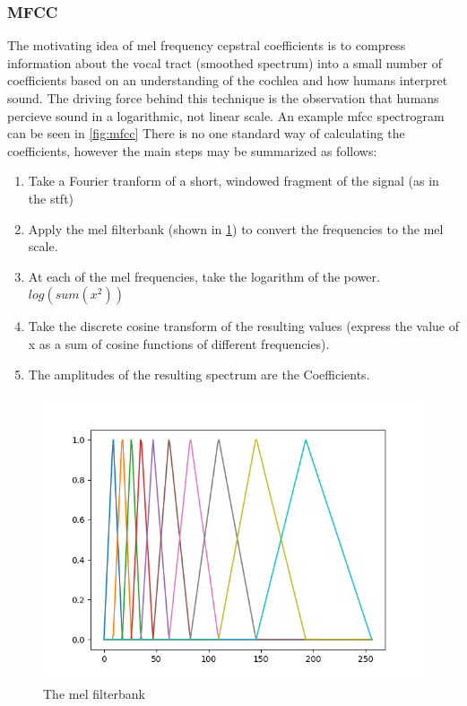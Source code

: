 \documentclass[11pt]{article}
\begin{document}
\subsubsection{MFCC}
\label{sec:org657745a}

The motivating idea of mel frequency cepstral coefficients is to compress information about the vocal tract (smoothed spectrum) into a small number of coefficients based on an understanding of the cochlea and how humans interpret sound. The driving force behind this technique is the observation that humans percieve sound in a logarithmic, not linear scale. An example mfcc spectrogram can be seen in \ref{fig:mfcc} There is no one standard way of calculating the coefficients, however the main steps may be summarized as follows:

\begin{enumerate}
    \item Take a Fourier tranform of a short, windowed fragment of the signal (as in the stft)
    \item Apply the mel filterbank (shown in \ref{fig:mel_filterbank}) to convert the frequencies to the mel scale.
    \item At each of the mel frequencies, take the logarithm of the power. $log(sum(x^{2}))$
    \item Take the discrete cosine transform of the resulting values (express the value of x as a sum of cosine functions of different frequencies).
    \item The amplitudes of the resulting spectrum are the Coefficients.
\end{enumerate}

\begin{figure}[h!]
\centering
\includegraphics[width=\textwidth]{./Figures/mel_filterbank.png}
\caption{\label{fig:mel_filterbank}The mel filterbank}
\end{figure}
\end{document}
